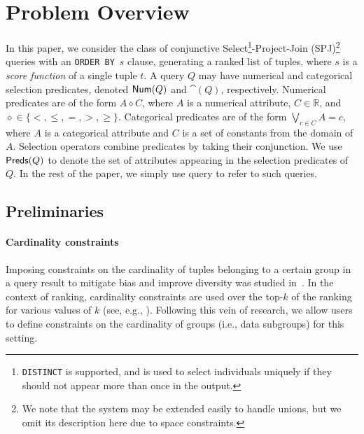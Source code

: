 \section{Problem Overview}
\label{sec:background}

In this paper, we consider the class of conjunctive Select\footnote{{\tt DISTINCT} is supported, and is used to select individuals uniquely if they should not appear more than once in the output.}-Project-Join (SPJ)\footnote{We note that the system may be extended easily to handle unions, but we omit its description here due to space constraints.} queries with an \texttt{ORDER BY}~$s$ clause, generating a ranked list of tuples, where $s$ is a \emph{score function} of a single tuple $t$.  
A query $Q$ may have numerical and categorical selection predicates, denoted $\textsf{Num}(Q)$ and $\cat(Q)$, respectively. Numerical predicates are of the form $A \diamond C$, where $A$ is a numerical attribute, $C \in \mathbb{R}$, and $\diamond \in \{<, \leq,=, >, \geq \}$. %
Categorical predicates are of the form $\bigvee_{c \in C} A = c$, where $A$ is a categorical attribute and $C$ is a set of constants from the domain of $A$. Selection operators combine predicates by taking their conjunction. We use $\textsf{Preds}(Q)$ to denote the set of attributes appearing in the selection predicates of $Q.$
In the rest of the paper, we simply use query to refer to such queries.












\subsection{Preliminaries}
\label{sec:cardinality-constraints}
\paragraph*{\textbf{Cardinality constraints}} Imposing constraints on the cardinality of tuples belonging to a certain group in a query result to mitigate bias and improve diversity was studied in~\cite{MLJ22, ERICA}. 
In the context of ranking, cardinality constraints are used over the top-$k$ of the ranking for various values of $k$ (see, e.g., \cite{CSV18,YGS19, ICDE23}). Following this vein of research, we allow users to define constraints on the cardinality of groups (i.e., data subgroups) for this setting. 

